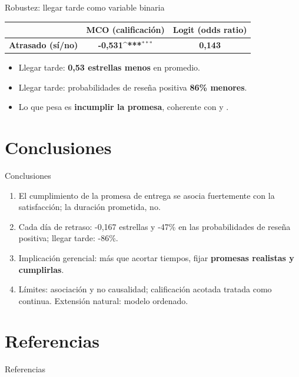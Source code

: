 \documentclass[11pt, aspectratio=169, table]{beamer}
\def\sym#1{\ifmmode^{#1}\else\(^{#1}\)\fi}
\begin{document}
\begin{frame}{Robustez: llegar tarde como variable binaria}
    \begin{center}
        \renewcommand{\arraystretch}{1.15}
        \small
        \begin{tabular}{lcc}
            \toprule
            & \textbf{MCO (calificación)} & \textbf{Logit (odds ratio)} \\
            \midrule
            \rowcolor{green!18}
            \textbf{Atrasado (sí/no)} & \textbf{-0,531\sym{***}} & \textbf{0,143} \\
            \bottomrule
        \end{tabular}
    \end{center}
    \vspace{0.3em}
    \begin{itemize}
        \setlength\itemsep{0.5em}
        \item Llegar tarde: \textbf{0,53 estrellas menos} en promedio.
        \item Llegar tarde: probabilidades de reseña positiva \textbf{86\% menores}.
        \item Lo que pesa es \textbf{incumplir la promesa}, coherente con \textcite{ravula2023} y \textcite{nozari2026}.
    \end{itemize}
\end{frame}

\section{Conclusiones}
\begin{frame}{Conclusiones}
    \begin{enumerate}
        \setlength\itemsep{0.55em}
        \item El cumplimiento de la promesa de entrega se asocia fuertemente con la satisfacción; la duración prometida, no.
        \item Cada día de retraso: -0,167 estrellas y -47\% en las probabilidades de reseña positiva; llegar tarde: -86\%.
        \item Implicación gerencial: más que acortar tiempos, fijar \textbf{promesas realistas y cumplirlas}.
        \item Límites: asociación y no causalidad; calificación acotada tratada como continua. Extensión natural: modelo ordenado.
    \end{enumerate}
\end{frame}

\section{Referencias}
\begin{frame}[allowframebreaks]{Referencias}
    \printbibliography
\end{frame}
\end{document}
